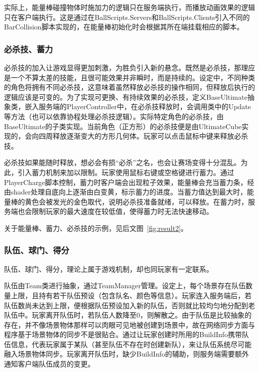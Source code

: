 \documentclass[conference]{IEEEtran}
\begin{document}
实际上，能量棒碰撞物体时施加力的逻辑只在服务端执行，而播放动画效果的逻辑只在客户端执行。这是通过在BallScripts.Servers和BallScripts.Clients引入不同的BarCollision脚本实现的，在能量棒初始化时会根据其所在端挂载相应的脚本。
\subsubsection{必杀技、蓄力}
\quad

必杀技的加入让游戏显得更加刺激，为胜负引入新的悬念。既然是必杀技，那理应是一个不算太差的技能，且很可能效果并非瞬时，而是持续的。设定中，不同种类的角色将拥有不同必杀技，这意味着虽然释放必杀技的操作相同，但释放后执行的逻辑应该是可变的。为了实现可更换、有持续效果的必杀技，定义BaseUltimate抽象类，嵌入服务端的PlayerController中，在必杀技释放时，会调用类中的Update等方法（也可以依靠协程处理必杀技逻辑）。实际特定角色的必杀技，由BaseUltimate的子类实现。当前角色（正方形）的必杀技便是由UltimateCube实现的，会向四周释放逐渐变大的方形几何体。玩家可以点击鼠标中键来释放必杀技。

必杀技如果能随时释放，想必会有损“必杀”之名，也会让赛场变得十分混乱。为此，引入蓄力机制来加以限制。玩家使用鼠标右键或空格键进行蓄力。通过PlayerCharge脚本控制，蓄力时客户端会出现粒子效果，能量棒会充当蓄力条，经由shader处理自底向上逐渐由白变黄，标示蓄力的进度。当蓄力值达到最大时，能量棒的黄色会被发光的金色取代，说明必杀技准备就绪，可以释放。在蓄力时，服务端也会限制玩家的最大速度在较低值，使得蓄力时无法快速移动。

关于能量棒、蓄力、必杀技的示例，见后文图~\ref{fig:result2}。

\subsubsection{队伍、球门、得分}
\quad

队伍、球门、得分，理论上属于游戏机制，却也同玩家有一定联系。

队伍由Team类进行抽象，通过TeamManager管理。设定上，每个场景存在队伍数量上限，且持有若干队伍预设（包含队名、颜色等信息）。玩家连入服务端后，若队伍数尚未达到上限，便根据队伍预设加入新的队伍，否则就比较均匀地分配到老队伍中。玩家离开队伍时，若队伍人数降至0，则解散之。由于队伍是比较抽象的存在，并不像场景物体那样可以肉眼可见地被创建到场景中，故在网络同步方面与程序基于场景物体的同步不是很贴合。通过让玩家创建时所用的BuildInfo携带队伍信息，代表玩家属于某队（甚至队伍不存在时创建新队），来让队伍系统尽可能融入场景物体同步。玩家离开队伍时，缺少BuildInfo的辅助，则服务端需要额外通知客户端队伍成员的变更。
\end{document}
